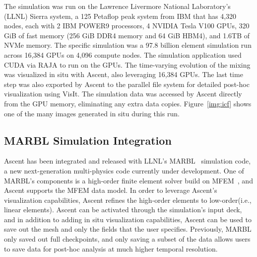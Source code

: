 The simulation was run on the Lawrence Livermore National Laboratory's (LLNL)
Sierra system, a 125 Petaflop peak system from IBM that has 4,320 nodes,
each with 2 IBM POWER9 processors, 4 NVIDIA Tesla V100 GPUs, 320 GiB of
fast memory (256 GiB DDR4 memory and 64 GiB HBM4), and 1.6TB of NVMe
memory. The specific simulation was a 97.8 billion element simulation
run across 16,384 GPUs on 4,096 compute nodes. The simulation application
used CUDA via RAJA to run on the GPUs. The time-varying evolution of the
mixing was visualized in situ with Ascent, also leveraging 16,384 GPUs.
The last time step was also exported by Ascent to the parallel file
system for detailed post-hoc visualization using VisIt\cite{VisIt}. The simulation
data was accessed by Ascent directly from the GPU memory, eliminating any
extra data copies.
Figure~\ref{img:icf} shows one of the many images generated in situ during
this run.

\subsection{MARBL Simulation Integration}
Ascent has been integrated and released with LLNL's MARBL~\cite{marbl} simulation code,
a new next-generation multi-physics code currently under development.
%
One of MARBL's components is a high-order finite element solver build on
MFEM~\cite{mfem}, and Ascent supports the MFEM data model.
%
In order to leverage Ascent's visualization capabilities, Ascent refines
the high-order elements to low-order(i.e., linear elements).
%
Ascent can be activated through the simulation's input deck, and in addition
to adding in situ visualization capabilities, Ascent can be used to save out
the mesh and only the fields that the user specifies.
%
Previously, MARBL only saved out full checkpoints, and only saving a subset of the
data allows users to save data for post-hoc analysis at much higher temporal resolution.

